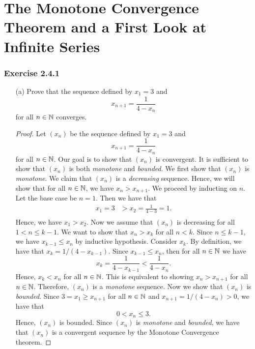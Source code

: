 \section{The Monotone Convergence Theorem and a First Look at Infinite Series}

\subsubsection{Exercise 2.4.1}
\begin{enumerate}
    \item[(a)] Prove that the sequence defined by \( x_1 = 3\) and 
        \[ x_{n+1} = \frac{1}{4 - x_n}\]
        for all \( n \in \mathbb{N} \) converges.
        \begin{proof}
            Let \( (x_n)\) be the sequence defined by \( x_1 = 3\) and 
            \[ x_{n+1} = \frac{1}{4-x_n}\]
            for all \( n \in \mathbb{N}\). Our goal is to show that \( (x_n)\) is convergent. It is sufficient to show that \( (x_n)\) is both \textit{monotone} and \textit{bounded}. We first show that \( (x_n)\) is \textit{monotone}. We claim that \( (x_n)\) is a \textit{decreasing} sequence. Hence, we will show that for all \( n \in \mathbb{N} \), we have \( x_n > x_{n+1}\). We proceed by inducting on \( n \). Let the base case be \( n = 1 \). Then we have that 
            \begin{align*}
                x_1 = 3 &> x_2 = \frac{1}{4 - 3} = 1. \\ 
            \end{align*}
            Hence, we have \( x_1 > x_2 \). Now we assume that \( (x_n)\) is decreasing for all \( 1 < n \leq k-1 \). We want to show that \( x_n > x_k \) for all \( n < k \). Since \( n \leq k - 1\), we have \( x_{k-1} \leq x_n \) by inductive hypothesis. Consider \( x_k \). By definition, we have that \( x_k = 1 /(4 - x_{k-1})\). Since \( x_{k-1} \leq x_n \), then for all \( n \in \mathbb{N} \) we have 
            \[
                x_k = \frac{1}{4 - x_{k-1}} < \frac{1}{4-x_n}.
            \]
            Hence, \( x_k < x_n \) for all \( n \in \mathbb{N} \). This is equivalent to showing \( x_n > x_{n+1}\) for all \( n \in \mathbb{N} \). Therefore, \( (x_n)\) is a \textit{monotone} sequence. 
            Now we show that \( (x_n)\) is \textit{bounded}. Since \( 3 = x_1 \geq x_{n+1}\) for all \( n \in \mathbb{N} \) and \( x_{n+1} = 1 / (4 - x_n) > 0 \), we have that 
            \[ 0 < x_n \leq 3.\]
            Hence, \( (x_n)\) is bounded. Since \( (x_n)\) is \textit{monotone} and \textit{bounded}, we have that 
            \( (x_n)\) is a convergent sequence by the Monotone Convergence theorem. 

\end{proof}
\end{enumerate}
